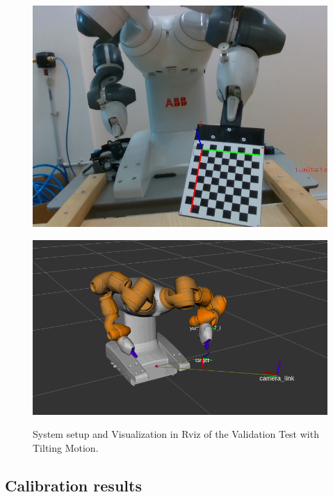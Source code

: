 \begin{figure}[htp]
\begin{center}
{
  \includegraphics[clip,width=0.7\columnwidth]{images/ext3.jpg}
}
\end{center}
\begin{center}
{
  \includegraphics[clip,width=0.7\columnwidth]{images/tilting2.png}
}
\end{center}
\caption{System setup and Visualization in Rviz of the Validation Test with Tilting Motion.}
\label{setupext2}
\end{figure}

\subsection{Calibration results}

